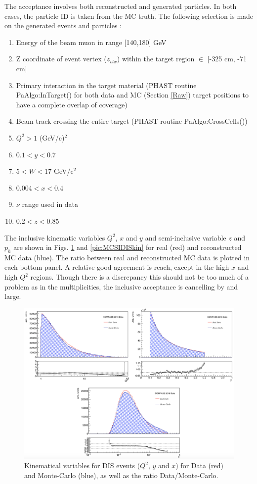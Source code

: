The acceptance involves both reconstructed and generated particles. In both cases, the particle ID is taken from the MC truth. The following selection is made on the generated events and particles :

\begin{enumerate}
  \item Energy of the beam muon in range [140,180] GeV
	\item Z coordinate of event vertex ($z_{vtx}$) within the target region $\in$ [-325 cm, -71 cm]
	\item Primary interaction in the target material (PHAST routine PaAlgo:InTarget() for both data and MC (Section \ref{Raw}) target positions
				to have a complete overlap of coverage)
	\item Beam track crossing the entire target (PHAST routine PaAlgo:CrossCells())
  \item $Q^2>1$ (GeV/c)$^2$
  \item $0.1 < y < 0.7$
	\item $5 < W < 17$ GeV/c$^2$
  \item $0.004 < x < 0.4$
  \item $\nu$ range used in data
  \item $0.2 < z < 0.85$
\end{enumerate}

The inclusive kinematic variables $Q^2$, $x$ and $y$ and semi-inclusive variable $z$ and $p_h$ are shown in Figs. \ref{pic:MCDISkin} and \ref{pic:MCSIDISkin} for real (red) and reconstructed MC data (blue). The ratio between real and reconstructed MC data is plotted in each bottom panel. A relative good agreement is reach, except in the high $x$ and high $Q^2$ regions. Though there is a discrepancy this should not be too much of a problem as in the multiplicities, the inclusive acceptance is cancelling by and large.

\begin{figure}[!h]
	\includegraphics[scale=0.45]{./gfx/DIS_kin.png}
	\caption{Kinematical variables for DIS events ($Q^2$, $y$ and $x$) for Data (red) and Monte-Carlo (blue), as well as the ratio Data/Monte-Carlo.}
	\label{pic:MCDISkin}
\end{figure}

